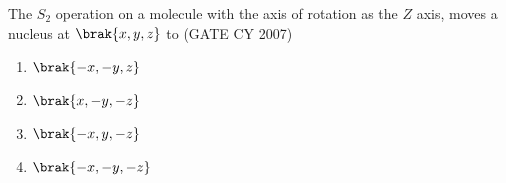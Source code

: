 \item The $S_2$ operation on a molecule with the axis of rotation as the $Z$ axis, moves a nucleus at $\brak{x, y, z}$ to \hfill (GATE CY 2007)
\begin{multicols}{4}
\begin{enumerate}
     \item   $\brak{-x, -y, z} $  
     \item   $\brak{x, -y, -z}$ 
     \item   $\brak{-x, y, -z}$
     \item   $\brak{-x, -y, -z}$
\end{enumerate}
\end{multicols}
 
